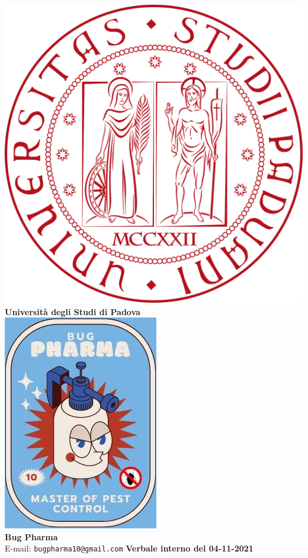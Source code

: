 \documentclass[11pt]{article}
\begin{document}
	\thispagestyle{empty}
	\begin{titlepage}
		\begin{center}
			\includegraphics[scale = 0.05]{../../logo_unipd.png}\\
			\large \textbf{Università degli Studi di Padova} \\
			\vfill
			\includegraphics[scale = 0.7]{../../logo_small.jpg}\\
			\large \textbf{Bug Pharma} \\
			\vfill
			\large
			E-mail: 
			\texttt{bugpharma10@gmail.com}
			\vfill
			\Huge \textbf{Verbale interno del 04-11-2021}\\
			

\end{center}
\end{titlepage}
\end{document}
